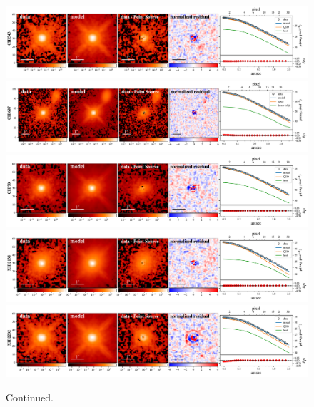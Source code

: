 \documentclass[apj]{emulateapj}
\begin{document}
\begin{figure}
\centering
{
\includegraphics[height=0.25\textwidth]{fig/best_fit_CID543_SB_profile.pdf}
\includegraphics[height=0.25\textwidth]{fig/best_fit_CID607_SB_profile.pdf}
\includegraphics[height=0.25\textwidth]{fig/best_fit_CID70_SB_profile.pdf}
\includegraphics[height=0.25\textwidth]{fig/best_fit_XID2138_SB_profile.pdf}
\includegraphics[height=0.25\textwidth]{fig/best_fit_XID2202_SB_profile.pdf}
}
\caption{\label{fig:ML} Continued.}
\end{figure} 
\end{document}

